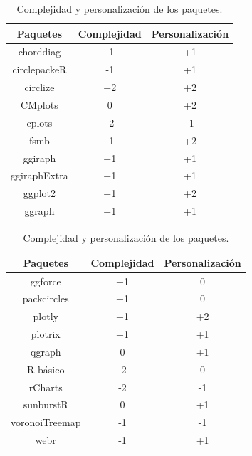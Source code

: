 \documentclass{article}\usepackage[]{graphicx}\usepackage[]{color}
\begin{document}
\begin{table}[h!]
\centering
\begin{tabular}{|c|c|c|} 
\hline
Paquetes & Complejidad & Personalizaci\'on\\
\hline
 chorddiag & -1 & +1\\%
\hline
circlepackeR & -1 & +1\\%
\hline
circlize & +2 & +2\\
\hline
CMplots & 0 & +2\\ %
\hline
cplots & -2 & -1\\ %
\hline
fsmb & -1 & +2\\ %
\hline
ggiraph & +1 & +1\\%
\hline
ggiraphExtra & +1 & +1\\%
\hline
ggplot2 & +1 & +2\\
\hline
ggraph & +1 & +1\\%
\hline
\end{tabular}
\begin{tabular}{|c|c|c|} 
\hline
Paquetes & Complejidad & Personalizaci\'on\\
\hline
ggforce & +1 & 0\\ %
\hline
packcircles & +1 & 0\\%
\hline
plotly & +1 & +2\\ %
\hline
plotrix & +1 & +1\\ %
\hline
qgraph & 0 & +1\\
\hline
R b\'asico & -2 & 0\\%
\hline
rCharts & -2 & -1\\%
\hline
sunburstR & 0 & +1\\%
\hline
voronoiTreemap & -1 & -1\\%
\hline
webr & -1 & +1\\%
\hline
\end{tabular}
\caption{Complejidad y personalizaci\'on de los paquetes.}
\label{table:tabla4}
\end{table}\par
\end{document}
